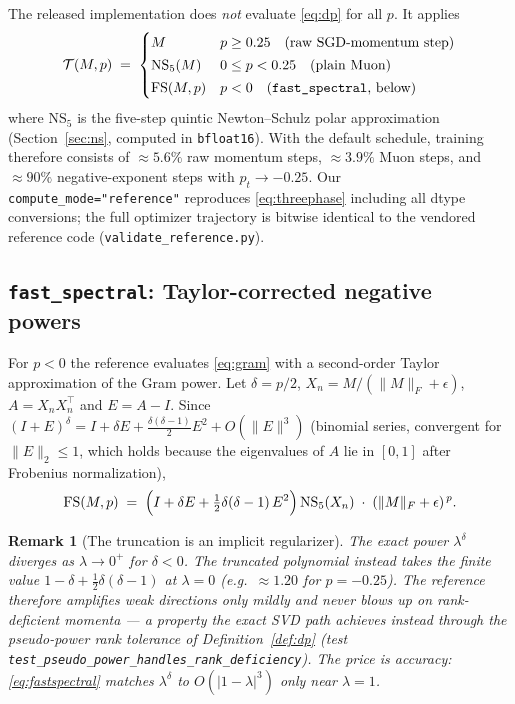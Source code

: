 \documentclass{article}
\newtheorem{remark}{Remark}
\begin{document}
The released implementation does \emph{not} evaluate \eqref{eq:dp} for all
$p$. It applies
\begin{equation}
\label{eq:threephase}
\mathcal{T}(M, p) \;=\;
\begin{cases}
M & p \ge 0.25 \quad\text{(raw SGD-momentum step)}\\[2pt]
\mathrm{NS}_5(M) & 0 \le p < 0.25 \quad\text{(plain Muon)}\\[2pt]
\mathrm{FS}(M, p) & p < 0 \quad\text{(\texttt{fast\_spectral}, below)}
\end{cases}
\end{equation}
where $\mathrm{NS}_5$ is the five-step quintic Newton--Schulz polar
approximation (Section~\ref{sec:ns}, computed in \texttt{bfloat16}). With the
default schedule, training therefore consists of $\approx 5.6\%$ raw momentum
steps, $\approx 3.9\%$ Muon steps, and $\approx 90\%$ negative-exponent
steps with $p_t \to -0.25$. Our \texttt{compute\_mode="reference"} reproduces
\eqref{eq:threephase} including all dtype conversions; the full optimizer
trajectory is bitwise identical to the vendored reference code
(\texttt{validate\_reference.py}).

\subsection{\texttt{fast\_spectral}: Taylor-corrected negative powers}

For $p<0$ the reference evaluates \eqref{eq:gram} with a second-order Taylor
approximation of the Gram power. Let $\delta = p/2$, $X_n = M/(\|M\|_F +
\epsilon)$, $A = X_n X_n^\top$ and $E = A - I$. Since
$(I + E)^{\delta} = I + \delta E + \tfrac{\delta(\delta-1)}{2} E^2 +
O(\|E\|^3)$ (binomial series, convergent for $\|E\|_2 \le 1$, which holds
because the eigenvalues of $A$ lie in $[0, 1]$ after Frobenius
normalization),
\begin{equation}
\label{eq:fastspectral}
\mathrm{FS}(M, p) \;=\;
\Bigl(I + \delta E + \tfrac{1}{2}\delta(\delta - 1)\,E^2\Bigr)\,
\mathrm{NS}_5(X_n)\;\cdot\;(\|M\|_F + \epsilon)^{\,p}.
\end{equation}

\begin{remark}[The truncation is an implicit regularizer]
\label{rem:taylor}
The exact power $\lambda^{\delta}$ diverges as $\lambda \to 0^+$ for
$\delta < 0$. The truncated polynomial instead takes the finite value
$1 - \delta + \tfrac{1}{2}\delta(\delta - 1)$ at $\lambda = 0$ (e.g.\
$\approx 1.20$ for $p = -0.25$). The reference therefore amplifies weak
directions only mildly and never blows up on rank-deficient momenta --- a
property the exact SVD path achieves instead through the pseudo-power rank
tolerance of Definition~\ref{def:dp}
(test \texttt{test\_pseudo\_power\_handles\_rank\_deficiency}). The price is
accuracy: \eqref{eq:fastspectral} matches $\lambda^\delta$ to
$O(|1-\lambda|^3)$ only near $\lambda = 1$.
\end{remark}
\end{document}
